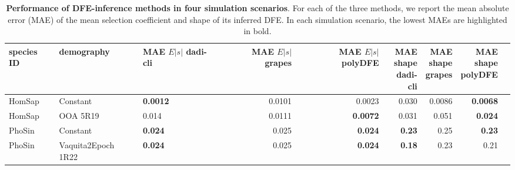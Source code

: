 \documentclass[hidelinks]{article}
\begin{document}
\begin{table}[h]
\centering
\small

\caption{\textbf{Performance of DFE-inference methods in four simulation scenarios}.
For each of the three methods, we report the mean absolute error (MAE) of the mean selection coefficient and shape of its inferred DFE.
In each simulation scenario, the lowest MAEs are highlighted in bold.}

\begin{tabular}{lllrrrrrr}
\toprule
species ID & demography & \makecell{MAE \\ $E|s|$ \\ dadi-cli} & \makecell{MAE \\ $E|s|$ \\ grapes} & \makecell{MAE \\ $E|s|$ \\ polyDFE} & \makecell{MAE \\ shape \\ dadi-cli} & \makecell{MAE \\ shape \\ grapes} & \makecell{MAE \\ shape \\ polyDFE} \\
\midrule
HomSap & Constant  & \bf{0.0012} & 0.0101 & 0.0023 & 0.030 & 0.0086 & \bf{0.0068} \\
HomSap & OOA 5R19  & 0.014 & 0.0111 & \bf{0.0072} & 0.031 & 0.051 & \bf{0.024} \\
PhoSin & Constant  & \bf{0.024} & 0.025 & \bf{0.024} & \bf{0.23} & 0.25 & \bf{0.23} \\
PhoSin & Vaquita2Epoch 1R22  & \bf{0.024} & 0.025 & \bf{0.024} & \bf{0.18} & 0.23 & 0.21 \\
\bottomrule
\end{tabular}
\label{tab:dfe_table}
\end{table}
\end{document}
